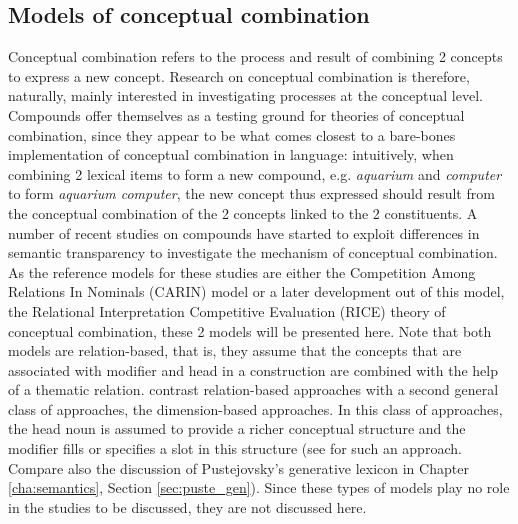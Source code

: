  

\subsection{Models of  conceptual combination}
\label{sec:conceptual_combination}
Conceptual combination refers to the process and result of combining 2 concepts to express a new
concept. Research on conceptual combination is therefore, naturally,
mainly interested in investigating processes at the conceptual
level. Compounds offer themselves as a testing ground for theories of
conceptual combination, since they appear to be what comes closest to
a bare-bones implementation of conceptual combination in language:
intuitively, when combining 2 lexical items to form a new compound,
e.g. \emph{aquarium} and \emph{computer} to form \emph{aquarium
  computer}, the new concept thus expressed should result from the
conceptual combination of the 2 concepts linked to the 2 constituents.
A number of recent studies on compounds have started to
exploit differences in semantic
transparency to investigate the mechanism of conceptual combination. As the reference models for these studies are either the
Competition Among Relations In Nominals (CARIN) model or a later development out of this model, the Relational Interpretation Competitive Evaluation (RICE) theory of
conceptual combination, these 2 models
will be presented here. Note that both models are
relation-based, that is, they assume that the concepts that are
associated with modifier and head in a construction are combined with
the help of a thematic relation. \citet{GagneandShoben:1997} contrast
relation-based approaches with a second general class of approaches,
the dimension-based approaches. In this class of approaches, the head
noun is assumed to provide a richer conceptual structure and the
modifier fills or specifies a slot in this structure (see \citealt{Smithetal:1988} for such an approach. Compare also the
discussion of Pustejovsky's generative lexicon in Chapter \ref{cha:semantics}, Section \ref{sec:puste_gen}). Since these types
of models play no role in the studies to be discussed, they are not
discussed here.

